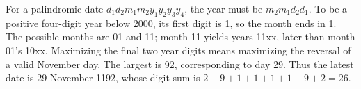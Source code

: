 For a palindromic date $d_1d_2m_1m_2y_1y_2y_3y_4$, the year must be $m_2m_1d_2d_1$. To be a positive four-digit year below 2000, its first digit is 1, so the month ends in 1. The possible months are 01 and 11; month 11 yields years 11xx, later than month 01's 10xx. Maximizing the final two year digits means maximizing the reversal of a valid November day. The largest is 92, corresponding to day 29. Thus the latest date is 29 November 1192, whose digit sum is $2+9+1+1+1+1+9+2=\boxed{26}$.
